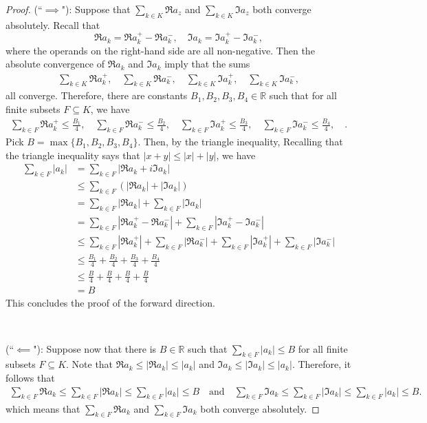 \documentclass[12pt]{article}
\newenvironment{sol}[1][Solution]{\begin{trivlist}
		\item[\hskip \labelsep {\bfseries #1:}]}{\end{trivlist}}
\begin{document}
\begin{sol}
	\begin{proof}
		(``$\implies$"): Suppose that $\sum_{k\in K}\Re a_z$ and $\sum_{k\in K} \Im a_z$
		both converge absolutely. Recall that
		\[
		\Re a_k=\Re a_k^+-\Re a_k^-,\quad \Im a_k=\Im a_k^+-\Im a_k^-,
		\]
		where the operands on the right-hand side are all non-negative.
		Then the absolute convergence of $\Re a_k$ and $\Im a_k$ imply that the
		sums
		\begin{align*}
			\sum_{k\in K}\Re a_k^+,\quad 
			\sum_{k\in K}\Re a_k^-,\quad 
			\sum_{k\in K}\Im a_k^+,\quad 
			\sum_{k\in K}\Im a_k^-,
		\end{align*}
		all converge.  Therefore, there are constants $B_1,B_2,B_3,B_4\in \mathbb{R}$ such that
		for all finite subsets $F\subseteq K$, we have
		\begin{align*}
			\sum_{k\in F}\Re a_k^+\leq \frac{B_1}{4},\quad 
			\sum_{k\in F}\Re a_k^-\leq \frac{B_2}{4},\quad 
			\sum_{k\in F}\Im a_k^+\leq \frac{B_3}{4},\quad 
			\sum_{k\in F}\Im a_k^-\leq \frac{B_4}{4},\quad.
		\end{align*}
		Pick $B=\max\{B_1,B_2,B_3,B_4\}$. Then, by the triangle inequality,
		Recalling that the triangle inequality says that $|x+y|\leq |x|+|y|$, we have
		\begin{align*}
			\sum_{k\in F}|a_k|&=\sum_{k\in F}|\Re a_k+i\Im a_k|\\
			&\leq \sum_{k\in F}(|\Re a_k| + |\Im a_k|)\\
			&=\sum_{k\in F}|\Re a_k| + \sum_{k\in F}|\Im a_k|\\
			&=\sum_{k\in F}|\Re a_k^+ - \Re a_k^-| + \sum_{k\in F}|\Im a_k^+ - \Im a_k^-|\\
			&\leq \sum_{k\in F}|\Re a_k^+|+\sum_{k\in F} |\Re a_k^-|
			+ \sum_{k\in F}|\Im a_k^+| + \sum_{k\in F} |\Im a_k^-|\\
			&\leq \frac{B_1}{4}+\frac{B_2}{4}+\frac{B_3}{4}+\frac{B_4}{4}\\
			&\leq \frac{B}{4}+\frac{B}{4}+\frac{B}{4}+\frac{B}{4}\\
			&= B
		\end{align*}
		This concludes the proof of the forward direction.
		
		\
		
		\noindent (``$\impliedby$"):  Suppose now that there is $B\in\mathbb{R}$
		such that $\sum_{k\in F}|a_k|\leq B$ for all finite subsets $F\subseteq K$.
		Note that $\Re a_k\leq |\Re a_k|\leq |a_k|$ and $\Im a_k\leq |\Im a_k|\leq |a_k|$.
		Therefore, it follows that
		\begin{align*}
			\sum_{k\in F}\Re a_k\leq \sum_{k\in F}|\Re a_k|\leq \sum_{k\in F}|a_k|\leq B
			\quad\text{and}\quad
			\sum_{k\in F}\Im a_k\leq \sum_{k\in F}|\Im a_k|\leq \sum_{k\in F}|a_k|\leq B.
		\end{align*}
		which means that $\sum_{k\in F}\Re a_k$ and $\sum_{k\in F}\Im a_k$ both
		converge absolutely.
	\end{proof}
\end{sol}
\end{document}
